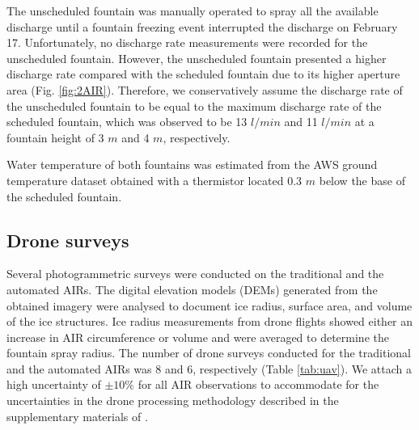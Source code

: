 \documentclass[tc, manuscript]{copernicus}
\begin{document}
The unscheduled fountain was manually operated to spray all the available discharge until a fountain freezing
event interrupted the discharge on February 17. Unfortunately, no discharge rate measurements were recorded
for the unscheduled fountain. However, the unscheduled fountain presented a higher discharge rate
compared with the scheduled fountain due to its higher aperture area (Fig. \ref{fig:2AIR}). Therefore, we
conservatively assume the discharge rate of the unscheduled fountain to be equal to the maximum discharge rate
of the scheduled fountain, which was observed to be 13 $l/min$ and 11 $l/min$ at a fountain height of 3 $m$ and 4
$m$, respectively.

Water temperature of both fountains was estimated from the AWS ground temperature dataset obtained with a thermistor located 0.3 $m$ below the base of the scheduled fountain.

\subsection{Drone surveys}

Several photogrammetric surveys were conducted on the traditional and the automated AIRs. The digital elevation
models (DEMs) generated from the obtained imagery were analysed to document ice radius, surface area, and
volume of the ice structures. Ice radius measurements from drone flights showed either an increase in
AIR circumference or volume and were averaged to determine the fountain spray radius. The number of drone surveys
conducted for the traditional and the automated AIRs was 8 and 6, respectively (Table \ref{tab:uav}). We
attach a high uncertainty of $\pm 10 \%$ for all AIR observations to accommodate for the uncertainties in
the drone processing methodology described in the supplementary materials of \citet{balasubramanianInfluenceMeteorologicalConditions2022}.
\end{document}
